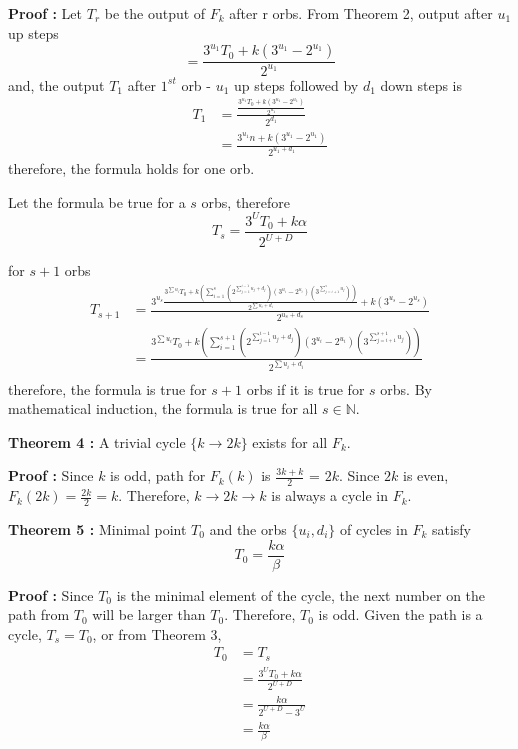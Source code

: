 \documentclass[12pt]{article} %
\begin{document}
\textbf{Proof :}
Let $T_r$ be the output of $F_k$ after r orbs. From Theorem 2, output after $u_1$ up steps
\begin{equation*}
=\frac{3^{u_1}T_0 +k(3^{u_1}-2^{u_1})}{2^{u_1}}
\end{equation*}
and, the output $T_1$ after $1^{st}$ orb -  $u_1$ up steps followed by $d_1$ down steps is
\begin{align*}
T_1 & =\frac{\frac{3^{u_1}T_0 +k(3^{u_1}-2^{u_1})}{2^{u_1}}}{2^{d_1}}\\
    & =\frac{3^{u_1}n +k(3^{u_1}-2^{u_1})}{2^{u_1+d_1}}
\end{align*}
therefore, the formula holds for one orb.

Let the formula be true for a $s$ orbs, therefore 
\begin{equation*}
T_s = \frac{3^U T_0 + k \alpha}{2^{U+D}}
\end{equation*}

for $s+1$ orbs
\begin{align*}
T_{s+1} & =\frac{3^{u_s}\frac{3^{\sum u_i}T_0 + k(\sum_{i=1}^{s}(2^{\sum_{j=1}^{i-1}u_j+d_j})(3^{u_i}-2^{u_i})(3^{\sum_{j=i+1}^{s} u_j}))}{2^{\sum u_i+d_i}} +k(3^{u_s}-2^{u_s})}{2^{u_s+d_s}}\\
 & = \frac{3^{\sum u_i}T_0 + k(\sum_{i=1}^{s+1}(2^{\sum_{j=1}^{i-1}u_j+d_j})(3^{u_i}-2^{u_i})(3^{\sum_{j=i+1}^{s+1} u_j}))}{2^{\sum u_i+d_i}}\\
\end{align*}
therefore, the formula is true for $s+1$ orbs if it is true for $s$ orbs. By mathematical induction, the formula is true for all $s \in \mathbb{N}$.
\newline

\textbf{Theorem 4 :}
A trivial cycle  $\{k \rightarrow 2k\}$ exists for all $F_k$.

\textbf{Proof :}
Since $k$ is odd, path for $F_k(k)$ is $\frac{3k+k}{2}$ = $2k$. Since $2k$ is even, $F_k(2k) = \frac{2k}{2} = k$. Therefore, $k \rightarrow 2k \rightarrow k$ is always a cycle in $F_k$.
\newline

\textbf{Theorem 5 :} Minimal point $T_0$ and the orbs $\{u_i, d_i\}$ of cycles in $F_k$ satisfy 
\begin{equation}
    T_0 = \frac{k \alpha}{\beta}
    \label{eq:cycle}
\end{equation}

\textbf{Proof :}
Since $T_0$ is the minimal element of the cycle, the next number on the path from $T_0$ will be larger than $T_0$. Therefore, $T_0$ is odd. Given the path is a cycle, $T_s = T_0$, or from Theorem 3, 
\begin{align*}
T_0 & = T_s \\
    & = \frac{3^U T_0 + k \alpha}{2^{U+D}}\\
    & = \frac{k \alpha}{2^{U+D} - 3^U}\\
    & = \frac{k \alpha}{\beta}
\end{align*} 
\end{document}
